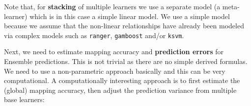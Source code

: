 \documentclass[
  graybox,natbib,nospthms]{svmono}
\newenvironment{Shaded}{\begin{snugshade}}{\end{snugshade}}
\newcommand{\AttributeTok}[1]{\textcolor[rgb]{0.61,0.61,0.61}{#1}}
\newcommand{\CommentTok}[1]{\textcolor[rgb]{0.37,0.37,0.37}{\textit{#1}}}
\newcommand{\ConstantTok}[1]{\textcolor[rgb]{0,0,0}{#1}}
\newcommand{\DecValTok}[1]{\textcolor[rgb]{0.06,0.06,0.06}{#1}}
\newcommand{\DocumentationTok}[1]{\textcolor[rgb]{0.37,0.37,0.37}{\textbf{\textit{#1}}}}
\newcommand{\FunctionTok}[1]{\textcolor[rgb]{0,0,0}{#1}}
\newcommand{\NormalTok}[1]{#1}
\newcommand{\OtherTok}[1]{\textcolor[rgb]{0.37,0.37,0.37}{#1}}
\newcommand{\SpecialCharTok}[1]{\textcolor[rgb]{0,0,0}{#1}}
\begin{document}
Note that, for \textbf{stacking} of multiple learners we use a separate model
(a meta-learner) which is in this case a simple linear model. We use a
simple model because we assume that the non-linear relationships have
already been modeled via complex models such as \texttt{ranger}, \texttt{gamboost}
and/or \texttt{ksvm}.

Next, we need to estimate mapping accuracy and \textbf{prediction errors} for
Ensemble predictions. This is not trivial as there are no simple derived formulas.
We need to use a non-parametric approach basically and this can be very computational.
A computationally interesting approach is to first estimate the (global) mapping
accuracy, then adjust the prediction variance from multiple base learners:

\begin{Shaded}
\end{Shaded}
\end{document}
